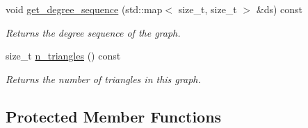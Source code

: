 \begin{DoxyCompactItemize}
void \hyperlink{classlgraph_1_1xxgraph_a5b21b51f5f9c55c05c0e8e5bc836bf87}{get\+\_\+degree\+\_\+sequence} (std\+::map$<$ size\+\_\+t, size\+\_\+t $>$ \&ds) const
\begin{DoxyCompactList}\small\item\em Returns the degree sequence of the graph. \end{DoxyCompactList}\item 
size\+\_\+t \hyperlink{classlgraph_1_1xxgraph_a90a9b60caf18179576af61dc962b95e3}{n\+\_\+triangles} () const
\begin{DoxyCompactList}\small\item\em Returns the number of triangles in this graph. \end{DoxyCompactList}\end{DoxyCompactItemize}
\subsection*{Protected Member Functions}
